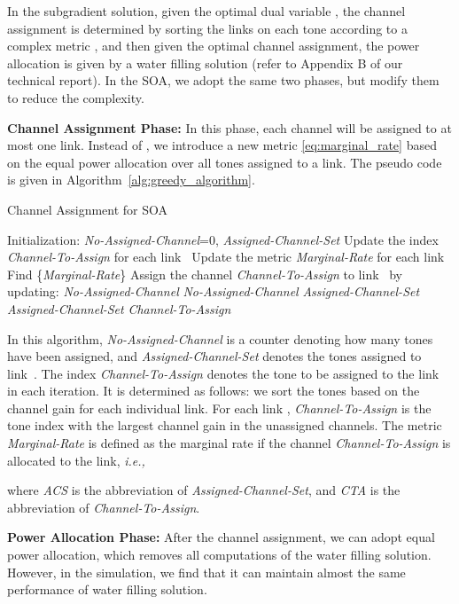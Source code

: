 \documentclass[conference]{IEEEtran}
\newcommand{\ie}{\emph{i.e., }}
\begin{document}
In the subgradient solution, given the optimal dual variable , the channel assignment is determined by sorting the links on each tone according to a complex metric , and then given the optimal channel assignment, the power allocation is given by a water filling solution (refer to Appendix B of our technical report). In the SOA, we adopt the same two phases, but modify them to reduce the complexity.

{\bf Channel Assignment Phase:} In this phase, each channel will be assigned to at most one link. Instead of , we introduce a new metric \eqref{eq:marginal_rate} based on the equal power allocation over all tones assigned to a link. The pseudo code is given in Algorithm~\ref{alg:greedy_algorithm}.
\begin{algorithm}[htb]
\caption{Channel Assignment for SOA}
\label{alg:greedy_algorithm}
\begin{algorithmic}[1]
\State Initialization: \emph{No-Assigned-Channel}=0,
\Statex \quad\quad\quad\quad\quad\;\;\emph{Assigned-Channel-Set}
	\State Update the index \emph{Channel-To-Assign} for each link~
	\State Update the metric \emph{Marginal-Rate} for each link~
	\State Find \{\emph{Marginal-Rate}\}
	\State Assign the channel \emph{Channel-To-Assign} to link~ by updating:
   \Statex \quad\quad\;\;\emph{No-Assigned-Channel}  \emph{No-Assigned-Channel} 
	\Statex \quad\quad\; \emph{Assigned-Channel-Set}  \emph{Assigned-Channel-Set}  \emph{Channel-To-Assign}
\EndWhile
\end{algorithmic}
\end{algorithm}
In this algorithm, \emph{No-Assigned-Channel} is a counter denoting how many tones have been assigned, and \emph{Assigned-Channel-Set} denotes the tones assigned to link~. The index \emph{Channel-To-Assign} denotes the tone to be assigned to the link~ in each iteration. It is determined as follows: we sort the tones based on the
channel gain for each individual link. For each link , \emph{Channel-To-Assign} is the tone index with the largest channel gain in  the unassigned channels. The metric \emph{Marginal-Rate} is defined as the marginal rate if the channel \emph{Channel-To-Assign} is allocated to the link, \ie

where \emph{ACS} is the abbreviation of \emph{Assigned-Channel-Set}, and \emph{CTA} is the abbreviation of  \emph{Channel-To-Assign}.

 {\bf Power Allocation Phase:} After the channel assignment, we can adopt equal power allocation, which removes all computations of the water filling solution. However, in the simulation, we find that it can maintain almost the same performance of water filling solution.
\end{document}
